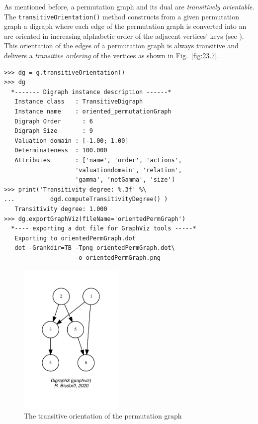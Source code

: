 As mentioned before, a permutation graph and its dual are \emph{transitively orientable}. The \texttt{transitiveOrientation()} method constructs from a given permutation graph a digraph where each edge of the permutation graph is converted into an arc oriented in increasing alphabetic order of the adjacent vertices' keys (see \citet{GOL-2004}). This orientation of the edges of a permutation graph is always transitive and delivers a \emph{transitive ordering} of the vertices as shown in Fig.~\vref{fig:23.7}.
\begin{lstlisting}
>>> dg = g.transitiveOrientation()
>>> dg
  *------- Digraph instance description ------*
   Instance class   : TransitiveDigraph
   Instance name    : oriented_permutationGraph
   Digraph Order      : 6
   Digraph Size       : 9
   Valuation domain : [-1.00; 1.00]
   Determinateness  : 100.000
   Attributes       : ['name', 'order', 'actions',
                    'valuationdomain', 'relation',
                    'gamma', 'notGamma', 'size']
>>> print('Transitivity degree: %.3f' %\
...          dgd.computeTransitivityDegree() ) 
   Transitivity degree: 1.000
>>> dg.exportGraphViz(fileName='orientedPermGraph')
  *---- exporting a dot file for GraphViz tools -----*
   Exporting to orientedPermGraph.dot
   dot -Grankdir=TB -Tpng orientedPermGraph.dot\
                    -o orientedPermGraph.png
\end{lstlisting}
\begin{figure}[h]
\sidecaption[t]
\includegraphics[width=5cm]{Figures/23-7-orientedPermGraph.pdf}
\caption{The transitive orientation of the permutation graph} 
\label{fig:23.7}       %
\end{figure}

